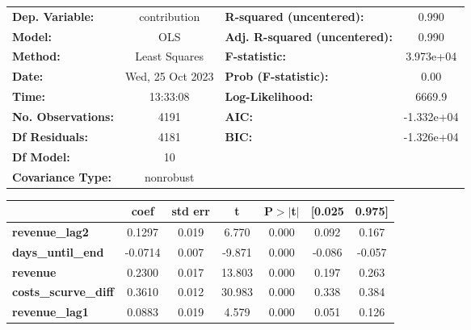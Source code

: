 \begin{center}
\begin{tabular}{lclc}
\toprule
\textbf{Dep. Variable:}      &   contribution   & \textbf{  R-squared (uncentered):}      &     0.990   \\
\textbf{Model:}              &       OLS        & \textbf{  Adj. R-squared (uncentered):} &     0.990   \\
\textbf{Method:}             &  Least Squares   & \textbf{  F-statistic:       }          & 3.973e+04   \\
\textbf{Date:}               & Wed, 25 Oct 2023 & \textbf{  Prob (F-statistic):}          &     0.00    \\
\textbf{Time:}               &     13:33:08     & \textbf{  Log-Likelihood:    }          &    6669.9   \\
\textbf{No. Observations:}   &        4191      & \textbf{  AIC:               }          & -1.332e+04  \\
\textbf{Df Residuals:}       &        4181      & \textbf{  BIC:               }          & -1.326e+04  \\
\textbf{Df Model:}           &          10      & \textbf{                     }          &             \\
\textbf{Covariance Type:}    &    nonrobust     & \textbf{                     }          &             \\
\bottomrule
\end{tabular}
\begin{tabular}{lcccccc}
                             & \textbf{coef} & \textbf{std err} & \textbf{t} & \textbf{P$> |$t$|$} & \textbf{[0.025} & \textbf{0.975]}  \\
\midrule
\textbf{revenue\_lag2}       &       0.1297  &        0.019     &     6.770  &         0.000        &        0.092    &        0.167     \\
\textbf{days\_until\_end}    &      -0.0714  &        0.007     &    -9.871  &         0.000        &       -0.086    &       -0.057     \\
\textbf{revenue}             &       0.2300  &        0.017     &    13.803  &         0.000        &        0.197    &        0.263     \\
\textbf{costs\_scurve\_diff} &       0.3610  &        0.012     &    30.983  &         0.000        &        0.338    &        0.384     \\
\textbf{revenue\_lag1}       &       0.0883  &        0.019     &     4.579  &         0.000        &        0.051    &        0.126     \\

\end{tabular}
\end{center}
